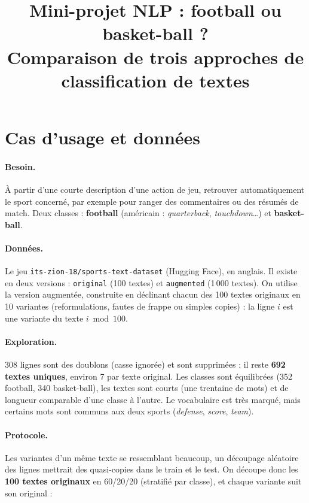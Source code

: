 \documentclass[11pt,a4paper]{article}
\title{Mini-projet NLP : football ou basket-ball ?\\[4pt]
\large Comparaison de trois approches de classification de textes}
\author{}
\date{}
\begin{document}
\maketitle
\vspace{-1.5cm}

\section{Cas d'usage et données}

\paragraph{Besoin.} À partir d'une courte description d'une action de jeu, retrouver automatiquement le sport concerné, par exemple pour ranger des commentaires ou des résumés de match. Deux classes : \textbf{football} (américain : \emph{quarterback}, \emph{touchdown}\ldots) et \textbf{basket-ball}.

\paragraph{Données.} Le jeu \texttt{its-zion-18/sports-text-dataset} (Hugging Face), en anglais. Il existe en deux versions : \texttt{original} (100 textes) et \texttt{augmented} (1\,000 textes). On utilise la version augmentée, construite en déclinant chacun des 100 textes originaux en 10 variantes (reformulations, fautes de frappe ou simples copies) : la ligne $i$ est une variante du texte $i \bmod 100$.

\paragraph{Exploration.} 308 lignes sont des doublons (casse ignorée) et sont supprimées : il reste \textbf{692 textes uniques}, environ 7 par texte original. Les classes sont équilibrées (352 football, 340 basket-ball), les textes sont courts (une trentaine de mots) et de longueur comparable d'une classe à l'autre. Le vocabulaire est très marqué, mais certains mots sont communs aux deux sports (\emph{defense}, \emph{score}, \emph{team}).

\paragraph{Protocole.} Les variantes d'un même texte se ressemblant beaucoup, un découpage aléatoire des lignes mettrait des quasi-copies dans le train et le test. On découpe donc les \textbf{100 textes originaux} en 60/20/20 (stratifié par classe), et chaque variante suit son original :
\end{document}
